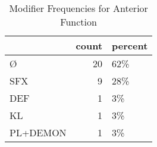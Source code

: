 \begin{table}[htbp!]
\centering
\caption{Modifier Frequencies for Anterior Function}
\label{table:ant_mod_cp}
\begin{tabular}{lrl}
\toprule
{} &  count & percent \\
\midrule
Ø        &     20 &     62\% \\
SFX      &      9 &     28\% \\
DEF      &      1 &      3\% \\
KL       &      1 &      3\% \\
PL+DEMON &      1 &      3\% \\
\bottomrule
\end{tabular}
\end{table}
